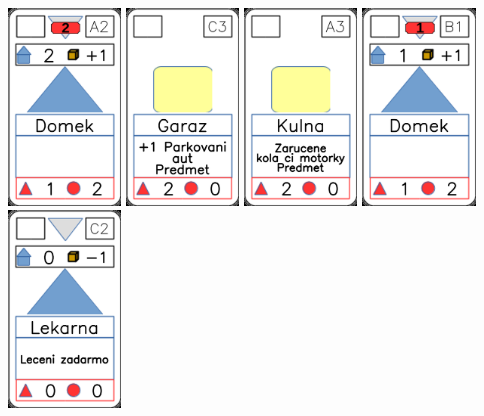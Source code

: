 \documentclass[a4paper]{article}
\begin{document}
	\includegraphics[width=3.0cm]{img-3_1}
	\includegraphics[width=3.0cm]{img-2_12}
	\includegraphics[width=3.0cm]{img-2_17}
	\includegraphics[width=3.0cm]{img-3_5}
	\includegraphics[width=3.0cm]{img-3_11}
\end{document}
